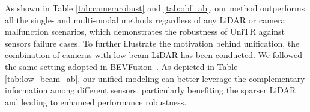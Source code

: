 \documentclass[10pt,twocolumn,letterpaper]{article}
\begin{document}
As shown in Table \ref{tab:camerarobust} and \ref{tab:obf_ab}, our method outperforms all the single- and multi-modal methods regardless of any LiDAR or camera malfunction scenarios, which demonstrates the robustness of UniTR against sensors failure cases. To further illustrate the motivation behind unification, the combination of cameras with low-beam LiDAR has been conducted. We followed the same setting adopted in BEVFusion~\cite{liu2022bevfusion}. As depicted in Table \ref{tab:low_beam_ab}, our unified modeling can better leverage the complementary information among different sensors, particularly benefiting the sparser LiDAR and leading to enhanced performance robustness.

\begin{table}[t]
   \scriptsize
\end{table}
\end{document}
